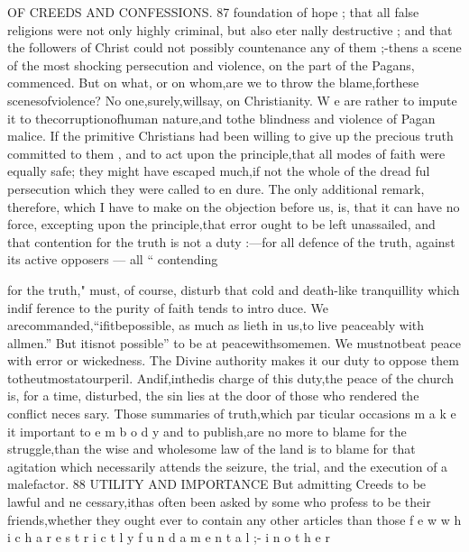 \documentclass[
]{book}
\begin{document}
OF CREEDS AND CONFESSIONS. 87
foundation of hope ; that all false religions were not only highly criminal, but also eter nally destructive ; and that the followers of
Christ could not possibly countenance any of
them ;-thens a scene of the most shocking
persecution and violence, on the part of the
Pagans, commenced. But on what, or on
whom,are we to throw the blame,forthese
scenesofviolence? No one,surely,willsay,
on Christianity. W e are rather to impute it
to thecorruptionofhuman nature,and tothe
blindness and violence of Pagan malice. If
the primitive Christians had been willing to
give up the precious truth committed to them ,
and to act upon the principle,that all modes
of faith were equally safe; they might have
escaped much,if not the whole of the dread
ful persecution which they were called to en dure.
The only additional remark, therefore, which I have to make on the objection before us, is, that it can have no force, excepting upon the principle,that error ought to be left unassailed, and that contention for the truth
is not a duty :---for all defence of the truth, against its active opposers --- all `` contending

for the truth," must, of course, disturb that cold and death-like tranquillity which indif
ference to the purity of faith tends to intro
duce. We arecommanded,``ifitbepossible,
as much as lieth in us,to live peaceably with
allmen.'' But itisnot possible'' to be at peacewithsomemen. We mustnotbeat
peace with error or wickedness. The Divine authority makes it our duty to oppose them
totheutmostatourperil. Andif,inthedis charge of this duty,the peace of the church is, for a time, disturbed, the sin lies at the door of those who rendered the conflict neces sary. Those summaries of truth,which par ticular occasions m a k e it important to e m b o d y and to publish,are no more to blame for the struggle,than the wise and wholesome law of
the land is to blame for that agitation which
necessarily attends the seizure, the trial, and the execution of a malefactor.
88 UTILITY AND IMPORTANCE
But admitting Creeds to be lawful and ne cessary,ithas often been asked by some who profess to be their friends,whether they ought ever to contain any other articles than those f e w w h i c h a r e s t r i c t l y f u n d a m e n t a l ;- i n o t h e r
\end{document}
